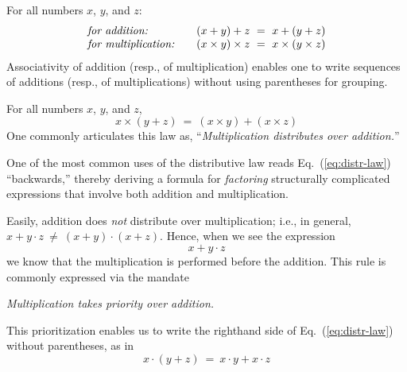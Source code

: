 \medskip

 

For all numbers $x$, $y$, and $z$:
\[
\begin{array}{llc}
\mbox{\it for addition:}
  & &
(x+y)+z \ = \ x+(y+z) \\
\mbox{\it for multiplication:}
  & & 
(x \times y) \times z \ = \ x \times (y \times z)
\end{array}
\] 
Associativity of addition (resp., of multiplication) enables one to write sequences of additions (resp., of multiplications) without using parentheses for grouping.

\medskip

 

For all numbers $x$, $y$, and $z$,
\begin{equation}
\label{eq:distr-law}
x \times (y + z) \ = \ (x \times y) + (x \times z)
\end{equation}
One commonly articulates this law as, ``{\em Multiplication distributes over addition.}''

\smallskip


One of the most common uses of the distributive law reads Eq.~(\ref{eq:distr-law}) ``backwards,'' thereby deriving a formula for {\em factoring} structurally complicated expressions that involve both addition and multiplication.

\smallskip

Easily, addition does {\em not} distribute over multiplication; i.e., in general, $x + y \cdot z \ \neq \ (x+y) \cdot (x+z)$.  Hence, when we see the expression
\[ x + y \cdot z \]
we know that the multiplication is performed before the addition.  This rule is commonly expressed via the mandate

\smallskip

{\em Multiplication takes priority over addition.}

\smallskip

\noindent This prioritization enables us to write the righthand side of Eq.~(\ref{eq:distr-law}) without parentheses, as in
\[ x \cdot (y + z) \ = \ x \cdot y + x \cdot z \]

\medskip

